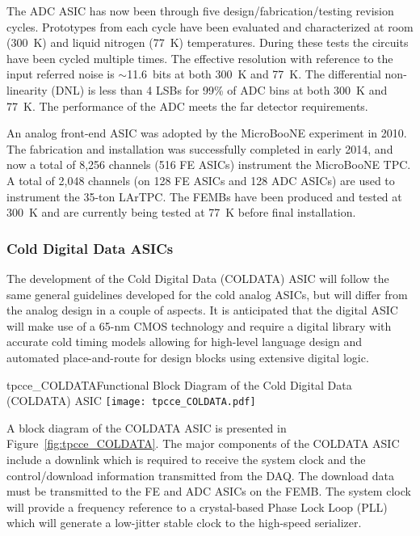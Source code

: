 The ADC ASIC has now been through five design/fabrication/testing revision cycles.
Prototypes from each cycle have been evaluated and characterized at room (300~K) and liquid nitrogen (77~K) temperatures.
During these tests the circuits have been cycled multiple times.
The effective resolution with reference to the input referred noise is $\sim$11.6~bits at both 300~K and 77~K.
The differential non-linearity (DNL) is less than 4 LSBs for 99\% of ADC bins at both 300~K and 77~K.
The performance of the ADC meets the far detector requirements.

An analog front-end ASIC was adopted by the MicroBooNE experiment in 2010.\cite{microboone-url}
The fabrication and installation was successfully completed in early 2014, and now 
a total of 8,256 channels (516 FE ASICs) instrument the MicroBooNE TPC. 
A total of 2,048 channels (on 128 FE ASICs and 128 ADC ASICs) are used to instrument the 35-ton 
LArTPC.
The FEMBs have been produced and tested at 300~K and are currently
being tested at 77~K before final installation. %


%
\subsubsection{Cold Digital Data ASICs}
\label{subsubsec:fe_CMOS_digital}

The development of the Cold Digital Data (COLDATA) ASIC will follow the same general guidelines developed for the cold analog ASICs,
but will differ from the analog design in a couple of aspects.
It is anticipated that the digital ASIC will make use of a 65-nm CMOS technology and require a
digital library with accurate cold timing models allowing for high-level language design and
automated place-and-route for design blocks using extensive digital logic.

\begin{cdrfigure}{tpcce_COLDATA}{Functional Block Diagram of the Cold Digital Data (COLDATA) ASIC}
\texttt{[image: tpcce\_COLDATA.pdf]}
\end{cdrfigure}

A block diagram of the COLDATA ASIC is presented in Figure~\ref{fig:tpcce_COLDATA}.
The major components of the COLDATA ASIC include a downlink which is required to receive the system clock and
the control/download information transmitted from the DAQ.
The download data must be transmitted to the FE and ADC ASICs on the FEMB.
The system clock will provide a frequency reference to a crystal-based Phase Lock Loop (PLL)
which will generate a low-jitter stable clock to the high-speed serializer.

